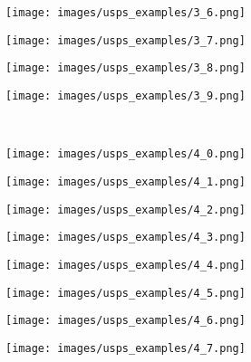 \begin{figure}[t]
\begin{subfigure}[c]{0.07\textwidth}
 \end{subfigure}
 \begin{subfigure}[c]{0.07\textwidth}
  \centering
  \texttt{[image: images/usps\_examples/3\_6.png]}
 \end{subfigure}
 \begin{subfigure}[c]{0.07\textwidth}
  \centering
  \texttt{[image: images/usps\_examples/3\_7.png]}
 \end{subfigure}
 \begin{subfigure}[c]{0.07\textwidth}
  \centering
  \texttt{[image: images/usps\_examples/3\_8.png]}
 \end{subfigure}
 \begin{subfigure}[c]{0.07\textwidth}
  \centering
  \texttt{[image: images/usps\_examples/3\_9.png]}
 \end{subfigure}
 \\
 \begin{subfigure}[c]{0.07\textwidth}
  \centering
  \texttt{[image: images/usps\_examples/4\_0.png]}
 \end{subfigure}
 \begin{subfigure}[c]{0.07\textwidth}
  \centering
  \texttt{[image: images/usps\_examples/4\_1.png]}
 \end{subfigure}
 \begin{subfigure}[c]{0.07\textwidth}
  \centering
  \texttt{[image: images/usps\_examples/4\_2.png]}
 \end{subfigure}
 \begin{subfigure}[c]{0.07\textwidth}
  \centering
  \texttt{[image: images/usps\_examples/4\_3.png]}
 \end{subfigure}
 \begin{subfigure}[c]{0.07\textwidth}
  \centering
  \texttt{[image: images/usps\_examples/4\_4.png]}
 \end{subfigure}
 \begin{subfigure}[c]{0.07\textwidth}
  \centering
  \texttt{[image: images/usps\_examples/4\_5.png]}
 \end{subfigure}
 \begin{subfigure}[c]{0.07\textwidth}
  \centering
  \texttt{[image: images/usps\_examples/4\_6.png]}
 \end{subfigure}
 \begin{subfigure}[c]{0.07\textwidth}
  \centering
  \texttt{[image: images/usps\_examples/4\_7.png]}

\end{subfigure}
\end{figure}
